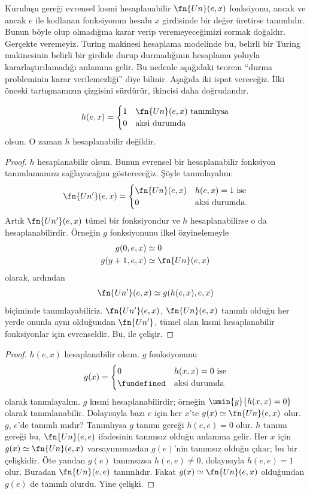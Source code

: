 \documentclass[../../../include/open-logic-section]{subfiles}
\begin{document}

Kuruluşu gereği evrensel kısmi hesaplanabilir $\fn{Un}(e,x)$ fonksiyonu,
ancak ve ancak $e$ ile kodlanan fonksiyonun hesabı $x$ girdisinde bir değer
üretirse tanımlıdır. Bunun böyle olup olmadığına karar verip veremeyeceğimizi
sormak doğaldır. Gerçekte veremeyiz. Turing makinesi hesaplama modelinde bu,
belirli bir Turing makinesinin belirli bir girdide durup durmadığının
hesaplama yoluyla kararlaştırılamadığı anlamına gelir. Bu nedenle aşağıdaki
teorem ``durma probleminin karar verilemezliği'' diye bilinir. Aşağıda iki
ispat vereceğiz. İlki önceki tartışmamızın çizgisini sürdürür, ikincisi daha
doğrudandır.

\begin{thm}
\[
  h(e,x)=\begin{cases}
    1 & \text{$\fn{Un}(e,x)$ tanımlıysa}\\
    0 & \text{aksi durumda}
  \end{cases}
\]
olsun. O zaman $h$ hesaplanabilir değildir.
\end{thm}

\begin{proof}
$h$ hesaplanabilir olsun. Bunun evrensel bir hesaplanabilir fonksiyon
tanımlamamızı sağlayacağını göstereceğiz. Şöyle tanımlayalım:
\[
  \fn{Un'}(e,x)=\begin{cases}
    \fn{Un}(e,x) & \text{$h(e,x)=1$ ise}\\
    0 & \text{aksi durumda.}
  \end{cases}
\]
Artık $\fn{Un'}(e,x)$ tümel bir fonksiyondur ve $h$ hesaplanabilirse o da
hesaplanabilirdir. Örneğin $g$ fonksiyonunu ilkel özyinelemeyle
\begin{align*}
  g(0,e,x) & \simeq 0\\
  g(y+1,e,x) & \simeq \fn{Un}(e,x)
\end{align*}
olarak, ardından
\[
  \fn{Un'}(e,x)\simeq g(h(e,x),e,x)
\]
biçiminde tanımlayabiliriz. $\fn{Un'}(e,x)$, $\fn{Un}(e,x)$ tanımlı olduğu
her yerde onunla aynı olduğundan $\fn{Un'}$, tümel olan kısmi hesaplanabilir
fonksiyonlar için evrenseldir. Bu,  ile çelişir.
\end{proof}

\begin{proof}
$h(e,x)$ hesaplanabilir olsun. $g$ fonksiyonunu
\[
  g(x)=\begin{cases}
    0 & \text{$h(x,x)=0$ ise}\\
    \fundefined & \text{aksi durumda}
  \end{cases}
\]
olarak tanımlayalım. $g$ kısmi hesaplanabilirdir; örneğin
$\umin{y}{h(x,x)=0}$ olarak tanımlanabilir. Dolayısıyla bazı $e$ için her
$x$'te $g(x)\simeq\fn{Un}(e,x)$ olur. $g$, $e$'de tanımlı mıdır? Tanımlıysa
$g$ tanımı gereği $h(e,e)=0$ olur. $h$ tanımı gereği bu,
$\fn{Un}(e,e)$ ifadesinin tanımsız olduğu anlamına gelir. Her $x$ için
$g(x)\simeq\fn{Un}(e,x)$ varsayımımızdan $g(e)$'nin tanımsız olduğu çıkar;
bu bir çelişkidir. Öte yandan $g(e)$ tanımsızsa $h(e,e)\neq0$, dolayısıyla
$h(e,e)=1$ olur. Buradan $\fn{Un}(e,e)$ tanımlıdır. Fakat
$g(x)\simeq\fn{Un}(e,x)$ olduğundan $g(e)$ de tanımlı olurdu. Yine çelişki.
\end{proof}
\end{document}
